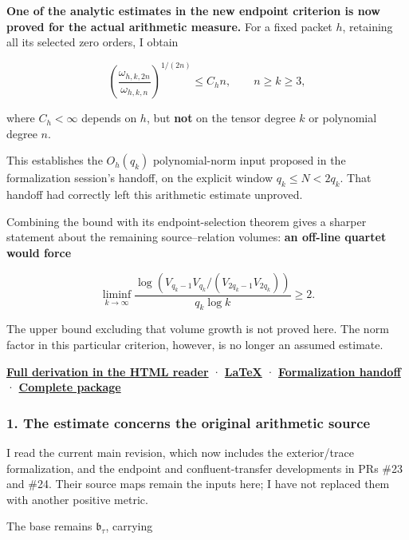 \textbf{One of the analytic estimates in the new endpoint criterion is now proved for the actual arithmetic measure.} For a fixed packet \(h\), retaining all its selected zero orders, I obtain

\[
\boxed{
\left(
\frac{\omega_{h,k,2n}}{\omega_{h,k,n}}
\right)^{1/(2n)}
\le C_h n,
\qquad n\ge k\ge3,
}
\]

where \(C_h<\infty\) depends on \(h\), but \textbf{not} on the tensor degree \(k\) or polynomial degree \(n\).

This establishes the \(O_h(q_k)\) polynomial-norm input proposed in the formalization session's handoff, on the explicit window \(q_k\le N<2q_k\). That handoff had correctly left this arithmetic estimate unproved.

Combining the bound with its endpoint-selection theorem gives a sharper statement about the remaining source--relation volumes: \textbf{an off-line quartet would force}

\[
\boxed{
\liminf_{k\to\infty}
\frac{
\log\!\left(
V_{q_k-1}V_{q_k}/(V_{2q_k-1}V_{2q_k})
\right)
}{
q_k\log k
}
\ge2.
}
\]

The upper bound excluding that volume growth is not proved here. The norm factor in this particular criterion, however, is no longer an assumed estimate.

\href{sources/web_arithmetic_endpoint_delivery/Tau_Arithmetic_Endpoint_Bounds/index.html}{\textbf{Full derivation in the HTML reader}} · \href{sources/web_arithmetic_endpoint_delivery/Tau_Arithmetic_Endpoint_Bounds/NOTE.tex}{\textbf{LaTeX}} · \href{sources/web_arithmetic_endpoint_delivery/Tau_Arithmetic_Endpoint_Bounds/HANDOFF.md}{\textbf{Formalization handoff}} · \href{sources/original_archives/Tau_Arithmetic_Endpoint_Bounds_2026-09-13.zip}{\textbf{Complete package}}

\subsubsection{1. The estimate concerns the original arithmetic source}\label{endpoint-user_norm_original--the-estimate-concerns-the-original-arithmetic-source}

I read the current main revision, which now includes the exterior/trace formalization, and the endpoint and confluent-transfer developments in PRs \#23 and \#24. Their source maps remain the inputs here; I have not replaced them with another positive metric.

The base remains \(\mathfrak b_\tau\), carrying

